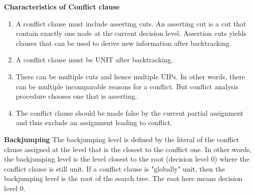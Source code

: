 \documentclass{article}
\begin{document}
\textbf{Characteristics of Conflict clause}
\begin{enumerate}
\item A conflict clause must include asserting cuts. An asserting cut is a cut
that contain exactly one node at the current decision level. Assertion cuts yields 
clauses that can be used to derive new information after backtracking.

\item A conflict clause must be UNIT after backtracking. 

\item There can be multiple cuts and hence multiple UIPs. In other words, there
can be multiple incomparable reasons for a conflict. But conflict analysis
procedure chooses one that is asserting. 

\item The conflict clause should be made false by the current partial assignment
and thus exclude an assignment leading to conflict. 
\end{enumerate}

\textbf{Backjumping}
The backjumping level is defined by the literal of the conflict clause assigned
at the level that is the closest to the conflict one. In other words, the
backjumping level is the level closest to the root (decision level 0)  where the
conflict clause is still unit. If a conflict clause is "globally"  unit, then
the backjumping level is the root of the search tree. The root here means
decision level 0. 
\end{document}

